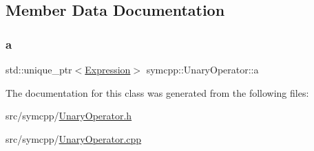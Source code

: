 \subsection{Member Data Documentation}
\mbox{\label{classsymcpp_1_1UnaryOperator_a1558842963261562d2ef68e324822cba}} 
\subsubsection{\texorpdfstring{a}{a}}
{\footnotesize\ttfamily std\+::unique\+\_\+ptr$<$\mbox{\hyperlink{classsymcpp_1_1Expression}{Expression}}$>$ symcpp\+::\+Unary\+Operator\+::a\hspace{0.3cm}{\ttfamily [protected]}}



The documentation for this class was generated from the following files\+:\begin{DoxyCompactItemize}
\item 
src/symcpp/\mbox{\hyperlink{UnaryOperator_8h}{Unary\+Operator.\+h}}\item 
src/symcpp/\mbox{\hyperlink{UnaryOperator_8cpp}{Unary\+Operator.\+cpp}}\end{DoxyCompactItemize}
